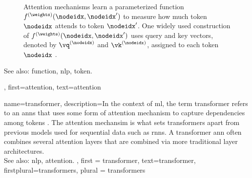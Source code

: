 {{\begin{figure}[H]
			\caption{Attention mechanisms learn a parameterized \gls{function} $f^{(\weights)}(\nodeidx,\nodeidx')$ to measure 
				how much token $\nodeidx$ attends to token $\nodeidx'$. One widely used construction of $f^{(\weights)}(\nodeidx,\nodeidx')$ 
				uses query and key \glspl{vector}, denoted by $\vq^{(\nodeidx)}$ and $\vk^{(\nodeidx)}$, assigned to each 
				token $\nodeidx$ \cite{vaswani2017attention}. \label{fig_attention_dict}}
		\end{figure}
		See also: \gls{function}, \gls{nlp}, \gls{token}.},
	first={attention},
	text={attention}
}

{name={transformer},
 description={In the context of \gls{ml}, the term transformer 
 	refers to an \glspl{ann} that uses some form of \gls{attention} mechanism 
 	to capture dependencies among \glspl{token} \cite{vaswani2017attention}. 
 	The \gls{attention} mechansim is what sets transformers apart from 
	previous \glspl{model} used for sequential \gls{data} such as \glspl{rnn}. 
	A transformer \gls{ann} often combines several \gls{attention} \glspl{layer} 
	that are combined via more traditional \gls{layer} architectures. \\ 
	See also: \gls{nlp}, \gls{attention}.
  }, 
 first = {transformer}, 
 text={transformer},
 firstplural={transformers}, 
 plural = {transformers}
}

